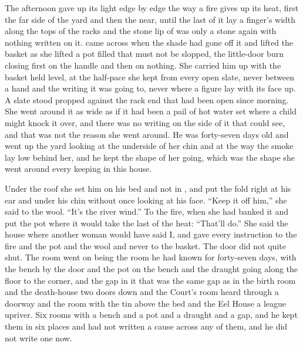 The afternoon gave up its light edge by edge the way a fire gives up its heat, first the far side of the yard and then the near, until the last of it lay a finger's width along the tops of the racks and the stone lip of  was only a stone again with nothing written on it.  came across when the shade had gone off it and lifted the basket as she lifted a pot filled that must not be slopped, the little-door burn closing first on the handle and then on nothing. She carried him up  with the basket held level, at the half-pace she kept from every open slate, never between a hand and the writing it was going to, never where a figure lay with its face up. A slate stood propped against the rack end that had been open since morning. She went around it as wide as if it had been a pail of hot water set where a child might knock it over, and there was no writing on the side of it that  could see, and that was not the reason she went around. He was forty-seven days old and went up the yard looking at the underside of her chin and at the way the smoke lay low behind her, and he kept the shape of her going, which was the shape she went around every keeping in this house.

Under the  roof she set him on his bed and not in , and put the fold right at his ear and under his chin without once looking at his face. “Keep it off him,” she said to the wool. “It's the river wind.” To the fire, when she had banked it and put the pot where it would take the last of the heat: “That'll do.” She said the house where another woman would have said I, and gave every instruction to the fire and the pot and the wool and never to the basket. The door did not quite shut. The room went on being the room he had known for forty-seven days, with the bench by the door and the pot on the bench and the draught going along the floor to the corner, and the gap in it that was the same gap as in the birth room and the death-house two doors down and the Court's room heard through a doorway and the room with the tin above the bed and the Eel House a league upriver. Six rooms with a bench and a pot and a draught and a gap, and he kept them in six places and had not written a cause across any of them, and he did not write one now.

\scenebreak

